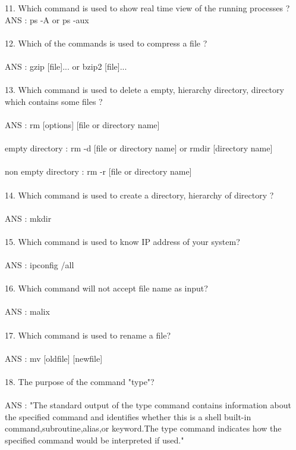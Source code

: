 \documentclass{article}
\begin{document}
11. Which command is used to show real time view of the running processes ?
ANS : ps -A or ps -aux \\ \\
12. Which of the commands is used to compress a file ?
\\ \\
ANS : gzip [file]... or bzip2 [file]...\\ \\
13. Which command is used to delete a empty, hierarchy directory, directory which contains some files ? \\ \\
ANS : rm [options] [file or directory name]\\ \\
\hspace*{1cm}empty directory : rm -d [file or directory name] or rmdir [directory name] \\ \\
\hspace*{1cm}non empty directory : rm -r [file or directory name]
\\ \\
14. Which command is used to create a directory, hierarchy of directory ? \\ \\
ANS : mkdir \\ \\
15. Which command is used to know IP address of your system? \\ \\
ANS : ipconfig /all \\ \\
16. Which command will not accept file name as input? \\ \\
ANS : malix \\ \\
17. Which command is used to rename a file? \\ \\ 
ANS : mv [oldfile] [newfile] \\ \\
18. The purpose of the command "type"? \\ \\
ANS : "The standard output of the type command contains information about the specified command
and identifies whether this is a shell built-in command,subroutine,alias,or keyword.The type
command indicates how the specified command would be interpreted if used." \\ \\
\end{document}

